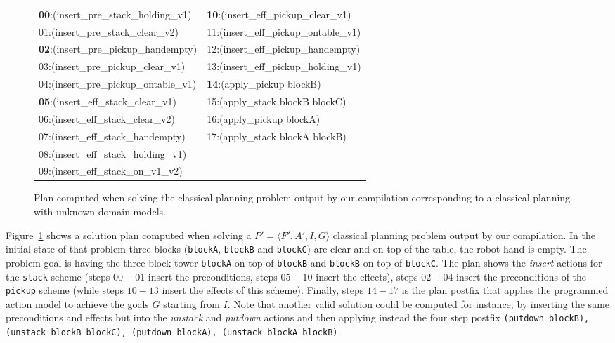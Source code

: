 \documentclass[letterpaper]{article} %
\newcommand{\tup}[1]{{\langle #1 \rangle}}
\begin{document}
\begin{figure}[hbt!]
	{\tiny\tt

\begin{tabular}{ll}
		{\bf 00}:(insert\_pre\_stack\_holding\_v1) & {\bf 10}:(insert\_eff\_pickup\_clear\_v1) \\
		01:(insert\_pre\_stack\_clear\_v2) & 11:(insert\_eff\_pickup\_ontable\_v1)\\
                {\bf 02}:(insert\_pre\_pickup\_handempty) & 12:(insert\_eff\_pickup\_handempty)\\
                03:(insert\_pre\_pickup\_clear\_v1) & 13:(insert\_eff\_pickup\_holding\_v1)\\
                04:(insert\_pre\_pickup\_ontable\_v1) & {\bf 14}:(apply\_pickup blockB)\\
                {\bf 05}:(insert\_eff\_stack\_clear\_v1) & 15:(apply\_stack blockB blockC)\\
                06:(insert\_eff\_stack\_clear\_v2) & 16:(apply\_pickup blockA)\\
                07:(insert\_eff\_stack\_handempty) & 17:(apply\_stack blockA blockB) \\
                08:(insert\_eff\_stack\_holding\_v1) & \\
                09:(insert\_eff\_stack\_on\_v1\_v2) &             		 
\end{tabular}
}
	\caption{\small Plan computed when solving the classical planning problem output by our compilation corresponding to a classical planning with unknown domain models.}
	\label{fig:plan-lplan}
\end{figure}

Figure~\ref{fig:plan-lplan} shows a solution plan computed when solving a $P'=\tup{F',A',I,G}$ classical planning problem output by our compilation. In the initial state of that problem three  blocks ({\small\tt blockA}, {\small\tt blockB} and {\small\tt blockC}) are clear and on top of the table, the robot hand is empty. The problem goal is having the three-block tower {\tt blockA} on top of {\tt blockB} and {\tt blockB} on top of {\tt blockC}. The plan shows the {\em insert} actions for the {\tt\small stack} scheme (steps $00-01$ insert the preconditions, steps $05-10$ insert the effects), steps $02-04$ insert the preconditions of the {\tt\small pickup} scheme (while steps $10-13$ insert the effects of this scheme). Finally, steps $14-17$ is the plan postfix that applies the programmed action model to achieve the goals $G$ starting from $I$. Note that another valid solution could be computed for instance, by inserting the same preconditions and effects but into the {\em unstack} and {\em putdown} actions and then applying instead the four step postfix {\tt\small (putdown blockB), (unstack blockB blockC), (putdown blockA), (unstack blockA blockB)}.
\end{document}
